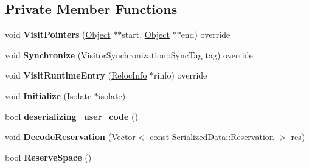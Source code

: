 \subsection*{Private Member Functions}
\begin{DoxyCompactItemize}
\item 
void {\bfseries Visit\+Pointers} (\hyperlink{classv8_1_1internal_1_1_object}{Object} $\ast$$\ast$start, \hyperlink{classv8_1_1internal_1_1_object}{Object} $\ast$$\ast$end) override\hypertarget{classv8_1_1internal_1_1_deserializer_a0320157499370069258d39c0538bedc7}{}\label{classv8_1_1internal_1_1_deserializer_a0320157499370069258d39c0538bedc7}

\item 
void {\bfseries Synchronize} (Visitor\+Synchronization\+::\+Sync\+Tag tag) override\hypertarget{classv8_1_1internal_1_1_deserializer_a7236e2944e7df09be0c7c01f5655afdc}{}\label{classv8_1_1internal_1_1_deserializer_a7236e2944e7df09be0c7c01f5655afdc}

\item 
void {\bfseries Visit\+Runtime\+Entry} (\hyperlink{classv8_1_1internal_1_1_reloc_info}{Reloc\+Info} $\ast$rinfo) override\hypertarget{classv8_1_1internal_1_1_deserializer_ab78932f9040302fffaad64cead9a2798}{}\label{classv8_1_1internal_1_1_deserializer_ab78932f9040302fffaad64cead9a2798}

\item 
void {\bfseries Initialize} (\hyperlink{classv8_1_1internal_1_1_isolate}{Isolate} $\ast$isolate)\hypertarget{classv8_1_1internal_1_1_deserializer_a1466d0682628662163d3b9fbaab41a1e}{}\label{classv8_1_1internal_1_1_deserializer_a1466d0682628662163d3b9fbaab41a1e}

\item 
bool {\bfseries deserializing\+\_\+user\+\_\+code} ()\hypertarget{classv8_1_1internal_1_1_deserializer_aa457da1f0bedc45ec1d253aa5027f7a7}{}\label{classv8_1_1internal_1_1_deserializer_aa457da1f0bedc45ec1d253aa5027f7a7}

\item 
void {\bfseries Decode\+Reservation} (\hyperlink{classv8_1_1internal_1_1_vector}{Vector}$<$ const \hyperlink{classv8_1_1internal_1_1_serialized_data_1_1_reservation}{Serialized\+Data\+::\+Reservation} $>$ res)\hypertarget{classv8_1_1internal_1_1_deserializer_a3e4ab7ca768425b3c3d8424c0cfdb638}{}\label{classv8_1_1internal_1_1_deserializer_a3e4ab7ca768425b3c3d8424c0cfdb638}

\item 
bool {\bfseries Reserve\+Space} ()\hypertarget{classv8_1_1internal_1_1_deserializer_a5cf9de6293b41ce7ab860e151c879b5d}{}\label{classv8_1_1internal_1_1_deserializer_a5cf9de6293b41ce7ab860e151c879b5d}


\end{DoxyCompactItemize}
